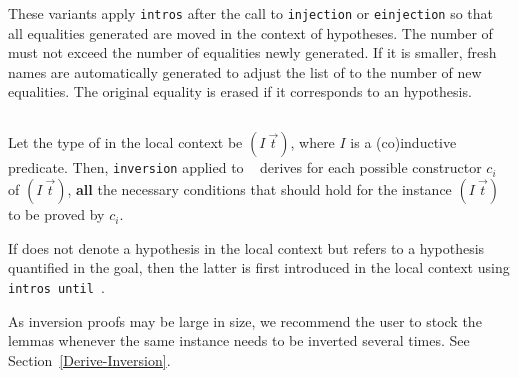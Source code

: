 \begin{Variants}
These variants apply \texttt{intros} \nelistnosep{\intropattern} after
the call to \texttt{injection} or \texttt{einjection} so that all
equalities generated are moved in the context of hypotheses. The
number of {\intropattern} must not exceed the number of equalities
newly generated. If it is smaller, fresh names are automatically
generated to adjust the list of {\intropattern} to the number of new
equalities. The original equality is erased if it corresponds to an
hypothesis.

\end{Variants}

\subsection{}

Let the type of {\ident} in the local context be $(I~\vec{t})$,
where $I$ is a (co)inductive predicate. Then,
\texttt{inversion} applied to \ident~ derives for each possible
constructor $c_i$ of $(I~\vec{t})$, {\bf all} the necessary
conditions that should hold for the instance $(I~\vec{t})$ to be
proved by $c_i$.

\Rem If {\ident} does not denote a hypothesis in the local context
but refers to a hypothesis quantified in the goal, then the
latter is first introduced in the local context using
\texttt{intros until \ident}.

\Rem As inversion proofs may be large in size, we recommend the user to
stock the lemmas whenever the same instance needs to be inverted
several times. See Section~\ref{Derive-Inversion}.

